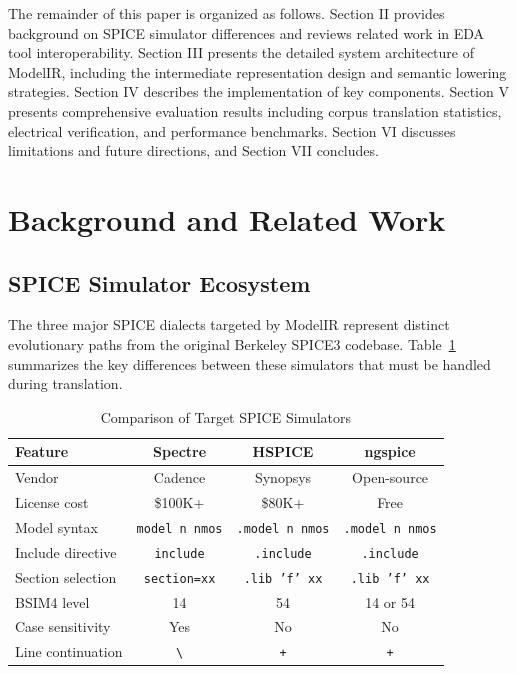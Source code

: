 \documentclass[conference]{IEEEtran}
\begin{document}
The remainder of this paper is organized as follows. Section II provides background on SPICE simulator differences and reviews related work in EDA tool interoperability. Section III presents the detailed system architecture of ModelIR, including the intermediate representation design and semantic lowering strategies. Section IV describes the implementation of key components. Section V presents comprehensive evaluation results including corpus translation statistics, electrical verification, and performance benchmarks. Section VI discusses limitations and future directions, and Section VII concludes.

\section{Background and Related Work}

\subsection{SPICE Simulator Ecosystem}

The three major SPICE dialects targeted by ModelIR represent distinct evolutionary paths from the original Berkeley SPICE3 codebase. Table~\ref{tab:simulators} summarizes the key differences between these simulators that must be handled during translation.

\begin{table}[htbp]
\caption{Comparison of Target SPICE Simulators}
\label{tab:simulators}
\centering
\begin{tabular}{p{2.2cm}ccc}
\toprule
\textbf{Feature} & \textbf{Spectre} & \textbf{HSPICE} & \textbf{ngspice} \\
\midrule
Vendor & Cadence & Synopsys & Open-source \\
License cost & \$100K+ & \$80K+ & Free \\
Model syntax & \texttt{model n nmos} & \texttt{.model n nmos} & \texttt{.model n nmos} \\
Include directive & \texttt{include} & \texttt{.include} & \texttt{.include} \\
Section selection & \texttt{section=xx} & \texttt{.lib 'f' xx} & \texttt{.lib 'f' xx} \\
BSIM4 level & 14 & 54 & 14 or 54 \\
Case sensitivity & Yes & No & No \\
Line continuation & \texttt{\textbackslash} & \texttt{+} & \texttt{+} \\
\bottomrule
\end{tabular}
\end{table}
\end{document}
